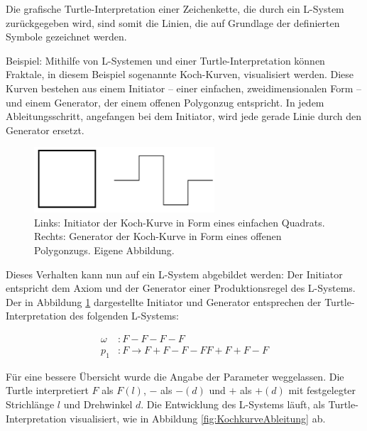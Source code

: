 Die grafische Turtle-Interpretation einer Zeichenkette, die durch ein L-System zurückgegeben wird, sind somit die Linien, die auf Grundlage der definierten Symbole gezeichnet werden. 

Beispiel: Mithilfe von L-Systemen und einer Turtle-Interpretation können Fraktale, in diesem Beispiel sogenannte Koch-Kurven, visualisiert werden. Diese Kurven bestehen aus einem Initiator -- einer einfachen, zweidimensionalen Form -- und einem Generator, der einem offenen Polygonzug entspricht. In jedem Ableitungsschritt, angefangen bei dem Initiator, wird jede gerade Linie durch den Generator ersetzt. \cite[S.39]{Mandelbrot:16} 

\begin{figure} [hbtp]
	\centering
	\includegraphics[width=0.6\textwidth]{images/InitiatorGenerator.png}
	\caption{Links: Initiator der Koch-Kurve in Form eines einfachen Quadrats. Rechts: Generator der Koch-Kurve in Form eines offenen Polygonzugs. Eigene Abbildung.}
	\label{fig:InitiatorGenerator}
\end{figure}

Dieses Verhalten kann nun auf ein L-System abgebildet werden: Der Initiator entspricht dem Axiom und der Generator einer Produktionsregel des L-Systems. Der in Abbildung \ref{fig:InitiatorGenerator} dargestellte Initiator und Generator entsprechen der Turtle-Interpretation des folgenden L-Systems:

\begin{equation}
\begin{array}{llll}
\omega & : F-F-F-F \\
p_1 & : F \rightarrow F+F-F-FF+F+F-F
\end{array}
\label{eq:ProdKochKurve}
\end{equation} 

Für eine bessere Übersicht wurde die Angabe der Parameter weggelassen. Die Turtle interpretiert $F$ als $F(l)$, $-$ als $-(d)$ und $+$ als $+(d)$ mit festgelegter Strichlänge $l$ und Drehwinkel $d$. \label{desc:TurtleWithoutParams} Die Entwicklung des L-Systems läuft, als Turtle-Interpretation visualisiert, wie in Abbildung \ref{fig:KochkurveAbleitung} ab.

